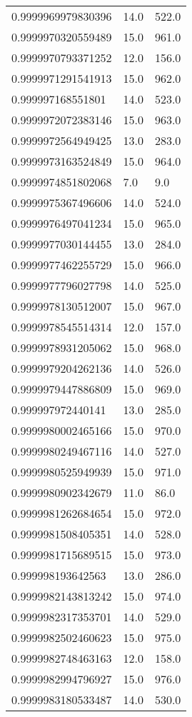 \begin{center}
\begin{supertabular}[H]{p{0.30\textwidth}p{0.05\textwidth}p{0.05\textwidth}}
0.9999969979830396 & 14.0 & 522.0 \\ 
0.9999970320559489 & 15.0 & 961.0 \\ 
0.9999970793371252 & 12.0 & 156.0 \\ 
0.9999971291541913 & 15.0 & 962.0 \\ 
0.999997168551801 & 14.0 & 523.0 \\ 
0.9999972072383146 & 15.0 & 963.0 \\ 
0.9999972564949425 & 13.0 & 283.0 \\ 
0.9999973163524849 & 15.0 & 964.0 \\ 
0.9999974851802068 & 7.0 & 9.0 \\ 
0.9999975367496606 & 14.0 & 524.0 \\ 
0.9999976497041234 & 15.0 & 965.0 \\ 
0.9999977030144455 & 13.0 & 284.0 \\ 
0.9999977462255729 & 15.0 & 966.0 \\ 
0.9999977796027798 & 14.0 & 525.0 \\ 
0.9999978130512007 & 15.0 & 967.0 \\ 
0.9999978545514314 & 12.0 & 157.0 \\ 
0.9999978931205062 & 15.0 & 968.0 \\ 
0.9999979204262136 & 14.0 & 526.0 \\ 
0.9999979447886809 & 15.0 & 969.0 \\ 
0.999997972440141 & 13.0 & 285.0 \\ 
0.9999980002465166 & 15.0 & 970.0 \\ 
0.9999980249467116 & 14.0 & 527.0 \\ 
0.9999980525949939 & 15.0 & 971.0 \\ 
0.9999980902342679 & 11.0 & 86.0 \\ 
0.9999981262684654 & 15.0 & 972.0 \\ 
0.9999981508405351 & 14.0 & 528.0 \\ 
0.9999981715689515 & 15.0 & 973.0 \\ 
0.999998193642563 & 13.0 & 286.0 \\ 
0.9999982143813242 & 15.0 & 974.0 \\ 
0.9999982317353701 & 14.0 & 529.0 \\ 
0.9999982502460623 & 15.0 & 975.0 \\ 
0.9999982748463163 & 12.0 & 158.0 \\ 
0.9999982994796927 & 15.0 & 976.0 \\ 
0.9999983180533487 & 14.0 & 530.0 \\ 

\end{supertabular}
\end{center}
